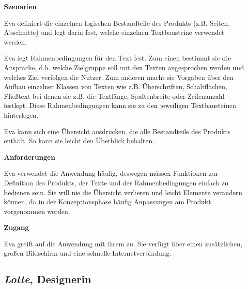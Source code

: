 \begin{multicols}{2}
\columnbreak

\textbf{Szenarien}

Eva definiert die einzelnen logischen Bestandteile des Produkts (z.B. Seiten, Abschnitte) und legt darin fest, welche einzelnen Textbausteine verwendet werden.

Eva legt Rahmenbedingungen für den Text fest. Zum einen bestimmt sie die Ansprache, d.h. welche Zielgruppe soll mit den Texten angesprochen werden und welches Ziel verfolgen die Nutzer. Zum anderen macht sie Vorgaben über den Aufbau einzelner Klassen von Texten wie z.B. Überschriften, Schaltflächen, Fließtext bei denen sie z.B. die Textlänge, Spaltenbreite oder Zeilenanzahl festlegt. Diese Rahmenbedingungen kann sie zu den jeweiligen Textbausteinen hinterlegen.

Eva kann sich eine Übersicht ausdrucken, die alle Bestandteile des Produkts enthält. So kann sie leicht den Überblick behalten.

\textbf{Anforderungen}

Eva verwendet die Anwendung häufig, deswegen müssen Funktionen zur Definition des Produkts, der Texte und der Rahmenbedingungen einfach zu bedienen sein. Sie will nie die Übersicht verlieren und leicht Elemente verändern können, da in der Konzeptionsphase häufig Anpassungen am Produkt vorgenommen werden. 

\textbf{Zugang}

Eva greift auf die Anwendung mit ihrem  zu. Sie verfügt über einen zusätzlichen, großen Bildschirm und eine schnelle Internetverbindung.

\end{multicols}

\pagebreak

\subsection{\emph{Lotte}, Designerin}\label{p:lotte}

